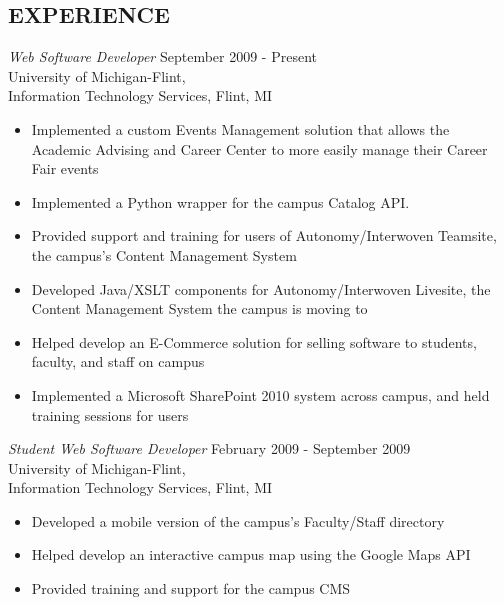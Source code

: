 \documentclass[line,margin]{res}
\begin{document}
\begin{resume}
\section{EXPERIENCE}
    {\sl Web Software Developer }
            \hfill September 2009 - Present \\
                   University of Michigan-Flint, \\
                   Information Technology Services, Flint, MI
        \begin{itemize}
            \item Implemented a custom Events Management solution that
                  allows the Academic Advising and Career Center to
                  more easily manage their Career Fair events
			\item Implemented a Python wrapper for the campus Catalog API.
            \item Provided support and training for users of Autonomy/Interwoven
                  Teamsite, the campus's Content Management System
            \item Developed Java/XSLT components for Autonomy/Interwoven Livesite, the
                  Content Management System the campus is moving to
            \item Helped develop an E-Commerce solution for selling software
                  to students, faculty, and staff on campus
            \item Implemented a Microsoft SharePoint 2010 system across
                  campus, and held training sessions for users \\
        \end{itemize}

    {\sl Student Web Software Developer }
            \hfill February 2009 - September 2009 \\
                   University of Michigan-Flint, \\
                   Information Technology Services, Flint, MI
        \begin{itemize}
            \item Developed a mobile version of the campus's Faculty/Staff
                  directory
            \item Helped develop an interactive campus map using the
                  Google Maps API
            \item Provided training and support for the campus CMS
        \end{itemize}

\newpage


\end{resume}
\end{document}
